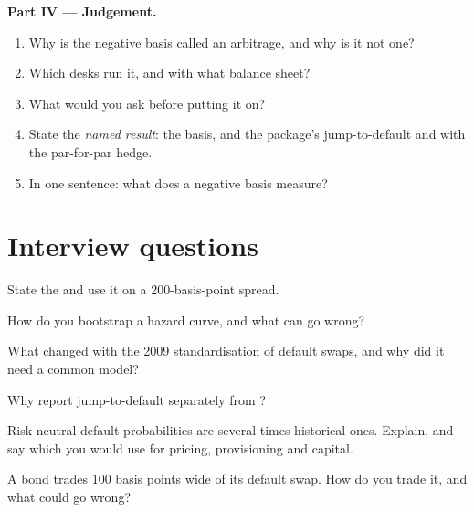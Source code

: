 \begin{problem}
\medskip\noindent\textbf{Part IV --- Judgement.}
\begin{enumerate}[resume]
\item Why is the negative basis called an arbitrage, and why is it not one?
\item Which desks run it, and with what balance sheet?
\item What would you ask before putting it on?
\item State the \emph{named result}: the basis, and the package's jump-to-default and 
with the par-for-par hedge.
\item In one sentence: what does a negative basis measure?
\end{enumerate}
\end{problem}

\section{Interview questions}

\begin{interviewq}\label{iq:rc:reduced-form-credit:1}
State the  and use it on a 200-basis-point spread.
\end{interviewq}

\begin{interviewq}\label{iq:rc:reduced-form-credit:2}
How do you bootstrap a hazard curve, and what can go wrong?
\end{interviewq}

\begin{interviewq}\label{iq:rc:reduced-form-credit:3}
What changed with the 2009 standardisation of default swaps, and why did it need a
common model?
\end{interviewq}

\begin{interviewq}\label{iq:rc:reduced-form-credit:4}
Why report jump-to-default separately from ?
\end{interviewq}

\begin{interviewq}\label{iq:rc:reduced-form-credit:5}
Risk-neutral default probabilities are several times historical ones. Explain, and say
which you would use for pricing, provisioning and capital.
\end{interviewq}

\begin{interviewq}\label{iq:rc:reduced-form-credit:6}
A bond trades 100 basis points wide of its default swap. How do you trade it, and what
could go wrong?
\end{interviewq}
